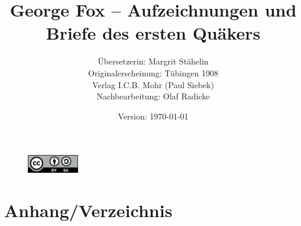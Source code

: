 \documentclass[a4paper,12pt,twoside]{book} %
\title{George Fox -- Aufzeichnungen und Briefe des ersten Quäkers}
\author{Übersetzerin: Margrit Stähelin \\ 
Originalerscheinung: Tübingen 1908 \\ 
Verlag I.C.B. Mohr (Paul Siebek) \\
Nachbearbeitung: Olaf Radicke
}
\date{Version: \today}
\begin{document}
\maketitle


\begin{figure}[h!]
 \centering
 \includegraphics[height=30px]{./pics/cc-lizenz-by.png}
\end{figure}

\newpage 

\tableofcontents

\newpage

\frontmatter 



\newpage 

\mainmatter 

% 




























% 
 
\backmatter

\chapter{Anhang/Verzeichnis}



\cleardoublepage


\cleardoublepage

\printindex

  \printindex[bibel]
\cleardoublepage

  \printindex[brief]
\cleardoublepage

  \printindex[buch]
\cleardoublepage

  \printindex[ort]
\cleardoublepage

  \printindex[person]
\cleardoublepage
\end{document}
